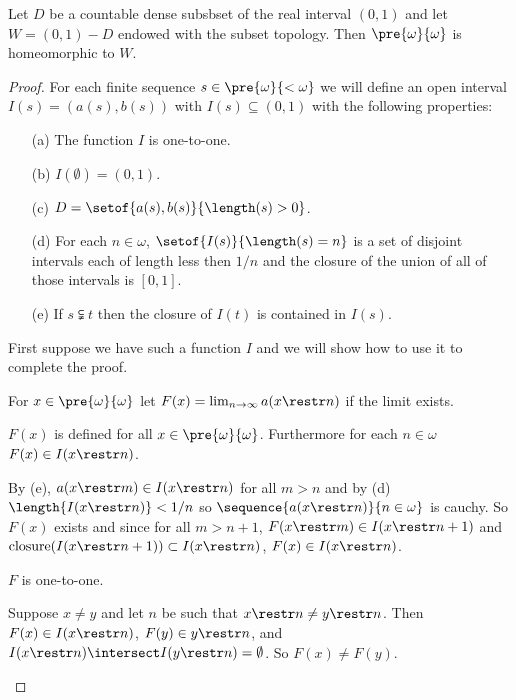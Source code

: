 \documentclass[oneside,12pt]{amsart}
\begin{document}
\begin{theorem}
Let $D$ be a countable dense subsbset of the real interval $(0,1)$ and let $W=(0,1) - D$
endowed with the subset topology.
Then $\pre{\omega}{\omega}$ is homeomorphic to $W$.
\end{theorem}
\begin{proof}
For each finite sequence $s\in \pre{\omega}{<\omega}$ we will define an open interval
$I(s) =  \left(a(s), b(s) \right)$ with $I(s)\subseteq (0,1)$ with the following properties:
\begin{itemize}
\item[(a)] The function $I$ is one-to-one.
\item[(b)] $I(\emptyset) = (0,1)$.
\item[(c)] $D = \setof{a(s), b(s)}{\length(s) > 0}$.
\item[(d)] For each $n\in\omega$, $\setof{I(s)}{\length(s) = n}$ is a set of disjoint intervals
each of length less then $1/n$ and the closure of the union of all of those intervals is $[0,1]$.
\item[(e)] If $s \subsetneqq t$ then the closure of $I(t)$ is contained in $I(s)$.
\end{itemize}

First suppose we have such a function $I$ and we will show how to use it to complete the proof.

For $x\in \pre{\omega}{\omega}$ let $F(x) = \lim_{n\to\infty} a(x\restr n)$ if the limit exists.

\begin{claim}
$F(x)$ is defined for all $x\in \pre{\omega}{\omega}$. Furthermore for each $n\in\omega$
$F(x) \in I(x\restr n)$.
\end{claim}
\begin{subproof}
By (e), $a(x\restr m) \in I(x\restr n)$ for all $m>n$ and by (d) $\length{I(x\restr n)} < 1/n$ so
$\sequence{a(x\restr n)}{n\in\omega}$ is cauchy. So $F(x)$ exists and since for all
$m>n+1$, $F(x\restr m) \in I(x\restr n+1)$ and
$\text{closure}(I(x\restr n+1)) \subset I(x\restr n)$, $F(x)\in I(x\restr n)$.
\end{subproof}

\begin{claim}
$F$ is one-to-one.
\end{claim}
\begin{subproof}
Suppose $x\not= y$ and let $n$ be such that $x\restr n \not= y\restr n$. Then
$F(x)\in I(x\restr n)$, $F(y) \in y\restr n$, and $I(x\restr n) \intersect I(y\restr n) = \emptyset$.
So $F(x)\not= F(y)$.
\end{subproof}


\end{proof}
\end{document}

